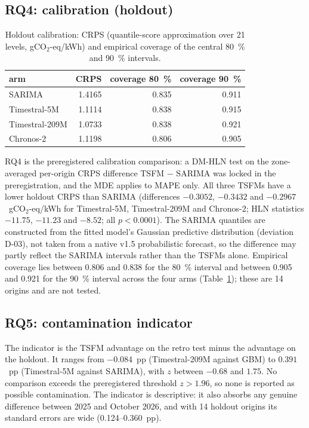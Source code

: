 \subsection{RQ4: calibration (holdout)}
\begin{table}[t]
\centering
\caption{Holdout calibration: CRPS (quantile-score approximation over 21 levels,
gCO$_2$-eq/kWh) and empirical coverage of the central 80~\% and 90~\% intervals.}
\label{tab:calib}
\begin{tabular}{lrrr}
\toprule
arm & CRPS & coverage 80~\% & coverage 90~\% \\
\midrule
SARIMA & 1.4165 & 0.835 & 0.911 \\
Timestral-5M & 1.1114 & 0.838 & 0.915 \\
Timestral-209M & 1.0733 & 0.838 & 0.921 \\
Chronos-2 & 1.1198 & 0.806 & 0.905 \\
\bottomrule
\end{tabular}
\end{table}

RQ4 is the preregistered calibration comparison: a DM-HLN test on the zone-averaged per-origin CRPS
difference TSFM $-$ SARIMA was locked in the preregistration, and the MDE applies to MAPE only.
All three TSFMs have a lower holdout CRPS than SARIMA (differences $-0.3052$, $-0.3432$ and
$-0.2967$~gCO$_2$-eq/kWh for Timestral-5M, Timestral-209M and Chronos-2; HLN statistics
$-11.75$, $-11.23$ and $-8.52$; all $p<0.0001$). The SARIMA quantiles are constructed from the
fitted model's Gaussian predictive distribution (deviation D-03), not taken from a native v1.5
probabilistic forecast, so the difference may partly reflect the SARIMA intervals rather than the
TSFMs alone. Empirical coverage lies between 0.806 and 0.838
for the 80~\% interval and between 0.905 and 0.921 for the 90~\% interval across the four arms
(Table~\ref{tab:calib}); these are 14 origins and are not tested.

\subsection{RQ5: contamination indicator}
The indicator is the TSFM advantage on the retro test minus the advantage on the holdout. It
ranges from $-0.084$~pp (Timestral-209M against GBM) to $0.391$~pp (Timestral-5M against
SARIMA), with $z$ between $-0.68$ and $1.75$. No comparison exceeds the preregistered threshold
$z>1.96$, so none is reported as possible contamination. The indicator is descriptive: it also
absorbs any genuine difference between 2025 and October 2026, and with 14 holdout origins its
standard errors are wide (0.124--0.360~pp).

